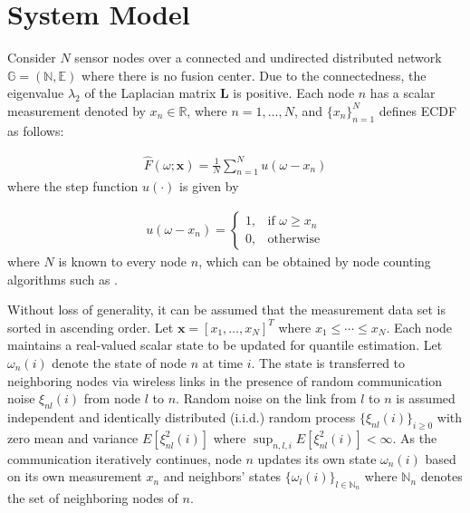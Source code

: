 \documentclass[journal]{IEEEtran}
\begin{document}
\vspace{-1mm}
\section{System Model} \label{system_model} 
\normalsize
Consider $N$ sensor nodes over a connected and undirected distributed network $\mathbb{G} = \left(\mathbb{N},\mathbb{E}\right)$ where there is no fusion center. Due to the connectedness, the eigenvalue $\lambda_{2}$ of the Laplacian matrix $\mathbf{L}$ is positive. Each node $n$ has a scalar measurement denoted by $x_n \in \mathbb{R}$, where $n=1,\ldots,N$, and $\{x_n\}_{n=1}^N$ defines ECDF as follows:

\vspace{-4mm}
\small
\begin{align}
\widehat{F}(\omega;\mathbf{x}) = \frac{1}{N}\sum_{n=1}^{N} u(\omega - x_n)   \label{eq:p_ecdf}
\end{align}
\normalsize
where the step function $u(\cdot)$ is given by

\vspace{-4mm}
\small
\begin{align}
u(\omega - x_n) = \left\{\begin{array}{cc}
1, & \text{if }  \omega \ge x_n  \\ 
0, & \text{otherwise}
\end{array}\right. 
\end{align}
\normalsize
{where $N$ is known to every node $n$, which can be obtained by node counting algorithms such as \cite{SZhang2017}.}

Without loss of generality, it can be assumed that the measurement data set is sorted in ascending order. Let $\mathbf{x} = \left[x_1,\ldots,x_N\right]^T$ where $x_1 \le \cdots \le x_N$. Each node maintains a real-valued scalar state to be updated for quantile estimation. Let $\omega_n(i)$ denote the state of node $n$ at time $i$. The state is transferred to neighboring nodes via wireless links in the presence of random communication noise $\xi_{nl}(i)$ from node $l$ to $n$. Random noise on the link from $l$ to $n$ is assumed independent and identically distributed (i.i.d.) random process $\{\xi_{nl}(i)\}_{i \ge 0}$ with zero mean and variance $E\left[\xi_{nl}^2(i)\right]$ where $\sup_{n,l,i} E\left[\xi_{nl}^2(i)\right] < \infty$. As the communication iteratively continues, node $n$ updates its own state $\omega_n(i)$ based on its own measurement $x_n$ and neighbors' states $\{\omega_l(i)\}_{l \in \mathbb{N}_n}$ where $\mathbb{N}_n$ denotes the set of neighboring nodes of $n$. 
\end{document}
